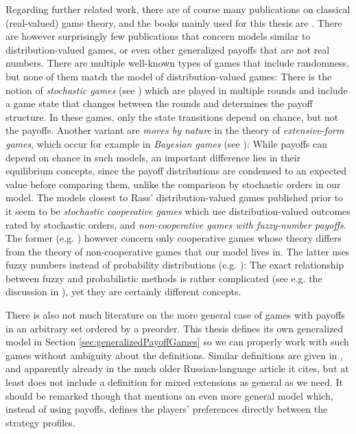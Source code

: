 \documentclass[a4paper]{scrreprt}
\theoremstyle{definition}
\begin{document}
    Regarding further related work, there are of course many publications on classical (real-valued) game theory, and the books mainly used for this thesis are \cites{bib:fudenbergGameTheory,bib:nisanAlgorithmicGameTheory,bib:matsumotoGameTheory}.
    There are however surprisingly few publications that concern models similar to distribution-valued games, or even other generalized payoffs that are not real numbers. There are multiple well-known types of games that include randomness, but none of them match the model of distribution-valued games: 
    There is the notion of \emph{stochastic games} (see \cite{bib:shapleyStochasticGames}) which are played in multiple rounds and include a game state that changes between the rounds and determines the payoff structure. In these games, only the state transitions depend on chance, but not the payoffs. 
    Another variant are \emph{moves by nature} in the theory of \emph{extensive-form games}, which occur for example in \emph{Bayesian games} (see \cite[Chapter 6 and Section 8.3]{bib:fudenbergGameTheory}): While payoffs can depend on chance in such models, an important difference lies in their equilibrium concepts, since the payoff distributions are condensed to an expected value before comparing them, unlike the comparison by stochastic orders in our model. 
    The models closest to Rass' distribution-valued games published prior to it seem to be \emph{stochastic cooperative games} which use distribution-valued outcomes rated by stochastic orders, and \emph{non-cooperative games with fuzzy-number payoffs}. 
    The former (e.g. \cite{bib:suijsCooperativeGamesWithStochasticPayoffs,bib:fernandezCoresOfStochasticCoopGamesWithStochasticOrders}) however concern only cooperative games whose theory differs from the theory of non-cooperative games that our model lives in. 
    The latter uses fuzzy numbers instead of probability distributions (e.g. \cite{bib:maedaCharacterizationOfEquilibriumFuzzyPayoff, bib:cevikelSolutionsFuzzyMatrixGames}): The exact relationship between fuzzy and probabilistic methods is rather complicated (see e.g. the discussion in \cite{bib:kandelDistinctionBetweenFuzzyAndStatisticalMethods}), yet they are certainly different concepts.
    
    There is also not much literature on the more general case of games with payoffs in an arbitrary set ordered by a preorder.
    This thesis defines its own generalized model in Section \ref{sec:generalizedPayoffGames} so we can properly work with such games without ambiguity about the definitions. Similar definitions are given in \cite{bib:rozenEquilibriaInGamesWithOrderedOutcomes}, and apparently already in the much older Russian-language article \cite{bib:vorobevThePresentStateOfGameTheory} it cites, but at least \cite{bib:rozenEquilibriaInGamesWithOrderedOutcomes} does not include a definition for mixed extensions as general as we need.
    It should be remarked though that \cite[Section 1.2.1]{bib:nisanAlgorithmicGameTheoryCh1Basic} mentions an even more general model which, instead of using payoffs, defines the players' preferences directly between the strategy profiles.
    
\end{document}
